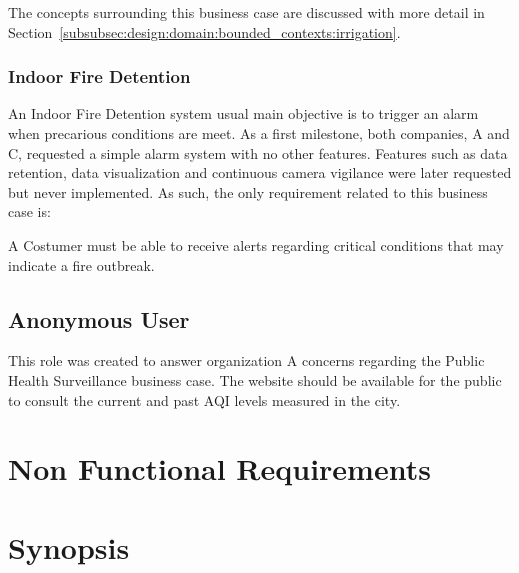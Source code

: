 The concepts surrounding this business case are discussed with more detail in Section~\ref{subsubsec:design:domain:bounded_contexts:irrigation}.

\subsubsection*{Indoor Fire Detention}
\label{subsubsec:requirements:functional:costumer:fire}

An Indoor Fire Detention system usual main objective is to trigger an alarm when precarious conditions are meet. As a first milestone, both companies, A and C, requested a simple alarm system with no other features. Features such as data retention, data visualization and continuous camera vigilance were later requested but never implemented. As such, the only requirement related to this business case is:

A Costumer must be able to receive alerts regarding critical conditions that may indicate a fire outbreak.

\subsection{Anonymous User}
\label{subsec:requirements:functional:anonymous}

This role was created to answer organization A concerns regarding the Public Health Surveillance business case. The website should be available for the public to consult the current and past \gls{AQI} levels measured in the city. 

\section{Non Functional Requirements}
\label{sec:requirements:non_functional}

\section{Synopsis}
\label{sec:requirements:synopsis}
